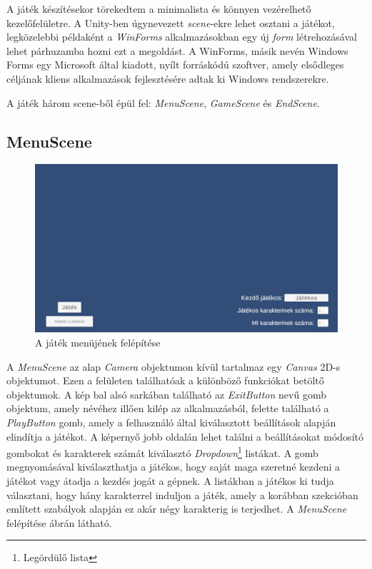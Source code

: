 \documentclass[
]{thesis-ekf}
\theoremstyle{definition}
\theoremstyle{remark}
\begin{document}
A játék készítésekor törekedtem a minimalista és könnyen vezérelhető kezelőfelületre. A Unity-ben úgynevezett \emph{scene}-ekre lehet osztani a játékot, legközelebbi példaként a \emph{WinForms} alkalmazásokban egy új \emph{form} létrehozásával lehet párhuzamba hozni ezt a megoldást. A WinForms, másik nevén Windows Forms egy Microsoft által kiadott, nyílt forráskódú szoftver, amely elsődleges céljának kliens alkalmazások fejlesztésére adtak ki Windows rendszerekre. \cite{winforms}

A játék három scene-ből épül fel: \emph{MenuScene}, \emph{GameScene} és \emph{EndScene}.

\subsection{MenuScene} \label{menusection}

\begin{figure}[h!]
	\centering
	\includegraphics[width=15cm]{./pictures/game_menu.png}
	\caption{A játék menüjének felépítése}
	\label{menuscene}
\end{figure}

A \emph{MenuScene} az alap \emph{Camera} objektumon kívül tartalmaz egy \emph{Canvas} 2D-s objektumot. Ezen a felületen találhatóak a különböző funkciókat betöltő objektumok. A kép bal alsó sarkában található az \emph{ExitButton} nevű gomb objektum, amely névéhez illően kilép az alkalmazásból, felette található a \emph{PlayButton} gomb, amely a felhasználó által kiválasztott beállítások alapján elindítja a játékot. A képernyő jobb oldalán lehet találni a beállításokat módosító gombokat és karakterek számát kiválasztó \emph{Dropdown}\footnote{Legördülő lista} listákat. A gomb megnyomásával kiválaszthatja a játékos, hogy saját maga szeretné kezdeni a játékot vagy átadja a kezdés jogát a gépnek. A listákban a játékos ki tudja választani, hogy hány karakterrel induljon a játék, amely a korábban  szekcióban említett szabályok alapján ez akár négy karakterig is terjedhet. A \emph{MenuScene} felépítése  ábrán látható.
\end{document}
